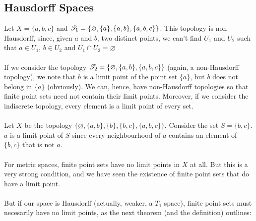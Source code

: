 \documentclass[main.tex]{subfiles}
\begin{document}
\subsection{Hausdorff Spaces}
\begin{example}
    Let $X=\{a,b,c\}$ and $\mathscr T_1=\{\varnothing, \{a\},\{a,b\}, \{a,b,c\} \}$. This topology is non-Hausdorff, since, given $a$ and $b$, two distinct points, we can't find $U_1$ and $U_2$ such that $a \in U_1$, $b \in U_2$ and $U_1 \cap U_2=\varnothing$
    \\\\ If we consider the topology $\mathscr T_2=\{\varnothing, \{a,b\},\{a,b,c\}\}$ (again, a non-Hausdorff topology), we note that $b$ is a limit point of the point set $\{a\}$, but $b$ does not belong in $\{a\}$ (obviously). We can, hence, have non-Hausdorff topologies so that finite point sets need not contain their limit points. Moreover, if we consider the indiscrete topology, every element is a limit point of every set.
    \\\\ Let $X$ be the topology $\{\varnothing, \{a,b\}, \{b\}, \{b,c\}, \{a,b,c\}\}$. Consider the set $S=\{b,c\}$. $a$ is a limit point of $S$ since every neighbourhood of $a$ contains an element of $\{b,c\}$ that is not $a$. 
    \\\\ For metric spaces, finite point sets have no limit points in $X$ at all. But this is a very strong condition, and we have seen the existence of finite point sets that do have a limit point. 
    \\\\ But if our space is Hausdorff (actually, weaker, a $T_1$ space), finite point sets must necesarily have no limit points, as the next theorem (and the definition) outlines:
\end{example}
\end{document}
